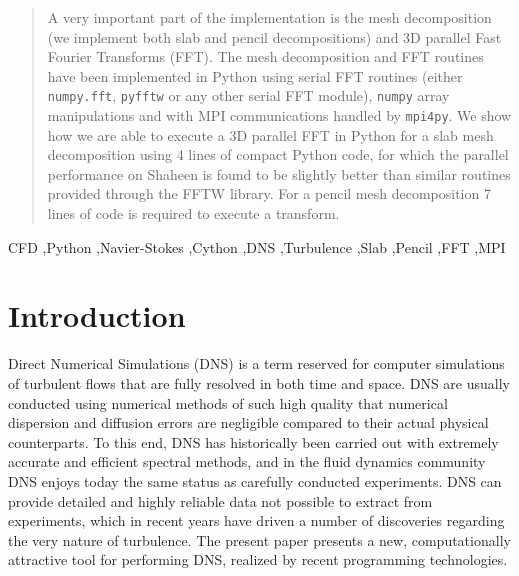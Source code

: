 \documentclass[final,1p,times]{elsarticle}
\newcommand{\inpyth}{\lstinline[style=inlinestyle]} %[]%
\begin{document}
\begin{frontmatter}
\begin{abstract}
A very important part of the implementation is the mesh decomposition (we implement both slab and pencil decompositions) and 3D parallel Fast Fourier Transforms (FFT). The mesh decomposition and FFT routines have been implemented in Python using serial FFT routines (either \inpyth{numpy.fft}, \inpyth{pyfftw} or any other serial FFT module), \inpyth{numpy} array manipulations and with MPI communications handled by \inpyth{mpi4py}. We show how we are able to execute a 3D parallel FFT in Python for a slab mesh decomposition using 4 lines of compact Python code, for which the parallel performance on Shaheen is found to be slightly better than similar routines provided through the FFTW library. For a pencil mesh decomposition 7 lines of code is required to execute a transform.


\end{abstract}

\begin{keyword}
CFD \sep Python \sep Navier-Stokes \sep Cython \sep DNS \sep Turbulence \sep Slab \sep Pencil \sep FFT \sep MPI

\end{keyword}

\end{frontmatter}

\section{Introduction}
Direct Numerical Simulations (DNS) is a term reserved for computer simulations of turbulent flows that are
fully resolved in both time and space. DNS are usually conducted using numerical methods of such high
quality that numerical dispersion and diffusion errors are negligible compared to their actual physical
counterparts. To this end, DNS has historically been carried out with extremely accurate and efficient
spectral methods, and in the fluid dynamics community DNS enjoys  today the same status as carefully
conducted experiments. DNS can provide detailed and highly reliable data not possible to extract from
experiments, which in recent years have driven a number of discoveries regarding the very nature of
turbulence. The present paper presents a new, computationally attractive tool for performing DNS, realized
by recent programming technologies.
\end{document}
